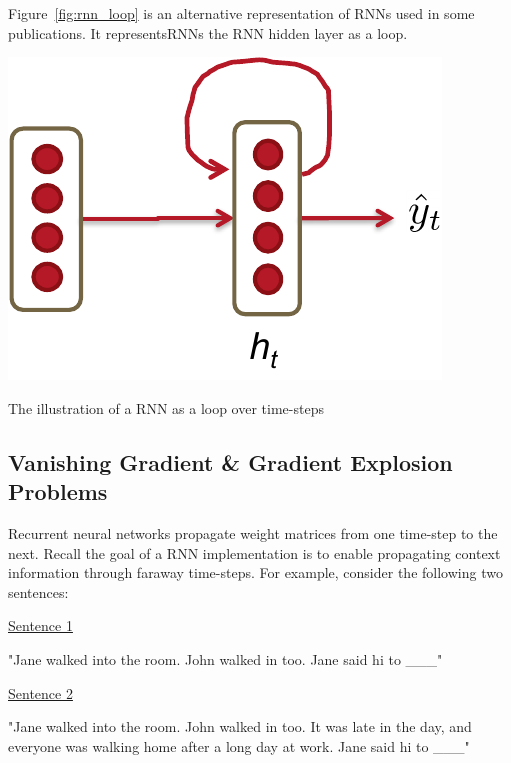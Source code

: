 \documentclass{tufte-handout}
\begin{document}
Figure~\ref{fig:rnn_loop} is an alternative representation of RNNs used in some publications. It representsRNNs the RNN hidden layer as a loop.
\begin{marginfigure}
	\centering
	\includegraphics[width=\linewidth]{rnn_loop.pdf}
	\caption {The illustration of a RNN as a loop over time-steps}
	\label{fig:rnn_loop}
\end{marginfigure}


\subsection{Vanishing Gradient \& Gradient Explosion Problems}
Recurrent neural networks propagate weight matrices from one time-step to the next. Recall the goal of a RNN implementation is to enable propagating context information through faraway time-steps. For example, consider the following two sentences:

\null
\centering
\uline{Sentence 1}

"Jane walked into the room. John walked in too. Jane said hi to \_\_\_"

\null
\uline{Sentence 2}

"Jane walked into the room. John walked in too. It was late in the day, and everyone was walking home after a long day at work. Jane said hi to \_\_\_"
\end{document}
